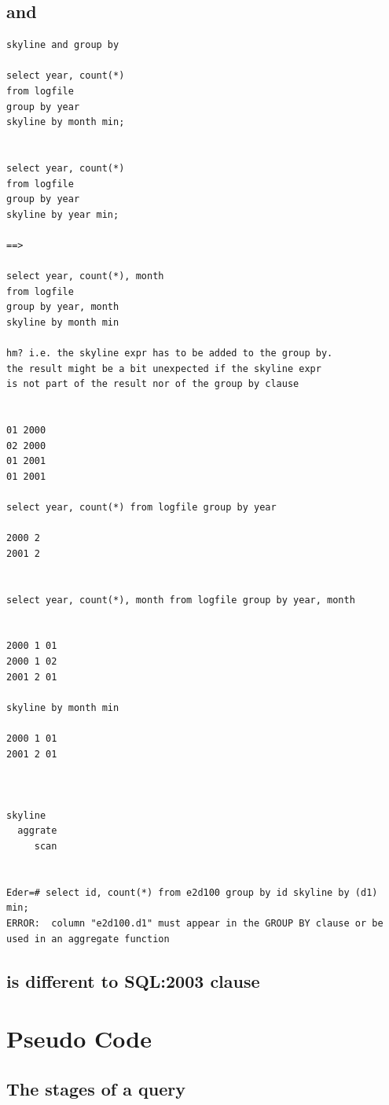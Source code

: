 \subsection{ and }
\begin{verbatim}
skyline and group by

select year, count(*)
from logfile
group by year
skyline by month min;


select year, count(*)
from logfile
group by year
skyline by year min;

==>

select year, count(*), month
from logfile
group by year, month
skyline by month min

hm? i.e. the skyline expr has to be added to the group by.
the result might be a bit unexpected if the skyline expr
is not part of the result nor of the group by clause


01 2000
02 2000
01 2001
01 2001

select year, count(*) from logfile group by year

2000 2
2001 2


select year, count(*), month from logfile group by year, month


2000 1 01
2000 1 02
2001 2 01

skyline by month min

2000 1 01
2001 2 01



skyline
  aggrate
     scan


Eder=# select id, count(*) from e2d100 group by id skyline by (d1) min;
ERROR:  column "e2d100.d1" must appear in the GROUP BY clause or be used in an aggregate function
\end{verbatim}

\subsection{ is different to SQL:2003  clause}


\section{Pseudo Code}

\subsection{The stages of a query}

